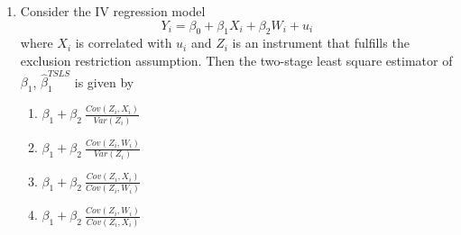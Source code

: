 \documentclass{article}
\begin{document}
\begin{enumerate}
\item Consider the IV regression model
\begin{equation*}
    Y_i = \beta_0 + \beta_1 X_i + \beta_2 W_i + u_i
\end{equation*}
where $X_i$ is correlated with $u_i$ and $Z_i$ is an instrument that fulfills the exclusion restriction assumption. Then the two-stage least square estimator of $\beta_1$, $\hat{\beta}_1^{TSLS}$ is given by
\begin{enumerate}[label=\alph*)]
\item $\beta_1+\beta_2~\frac{Cov(Z_i, X_i)}{Var(Z_i)}$
\item $\beta_1+\beta_2~\frac{Cov(Z_i, W_i)}{Var(Z_i)}$ 
\item $\beta_1+\beta_2~\frac{Cov(Z_i, X_i)}{Cov(Z_i, W_i)}$
\item $\beta_1+\beta_2~\frac{Cov(Z_i, W_i)}{Cov(Z_i, X_i)}$ 
\end{enumerate}\vspace{.25cm}




\end{enumerate}


\newpage
{}\\[2em]
\end{document}
